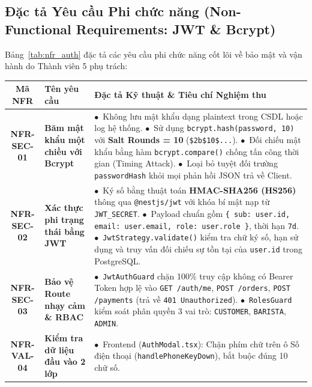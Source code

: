 \documentclass[a4paper]{article}
\begin{document}
\subsection{Đặc tả Yêu cầu Phi chức năng (Non-Functional Requirements: JWT \& Bcrypt)}
Bảng~\ref{tab:nfr_auth} đặc tả các yêu cầu phi chức năng cốt lõi về bảo mật và vận hành do Thành viên 5 phụ trách:

\begin{table}[H]
\centering
\small
\begin{tabularx}{\textwidth}{|c|p{3.2cm}|X|}
\hline
\textbf{Mã NFR} & \textbf{Tên yêu cầu} & \textbf{Đặc tả Kỹ thuật \& Tiêu chí Nghiệm thu} \\ \hline
\textbf{NFR-SEC-01} & \textbf{Băm mật khẩu một chiều với Bcrypt} & 
$\bullet$~Không lưu mật khẩu dạng plaintext trong CSDL hoặc log hệ thống. \newline
$\bullet$~Sử dụng \texttt{bcrypt.hash(password, 10)} với \textbf{Salt Rounds = 10} (\texttt{\$2b\$10\$...}). \newline
$\bullet$~Đối chiếu mật khẩu bằng hàm \texttt{bcrypt.compare()} chống tấn công thời gian (Timing Attack). \newline
$\bullet$~Loại bỏ tuyệt đối trường \texttt{passwordHash} khỏi mọi phản hồi JSON trả về Client. \\ \hline
\textbf{NFR-SEC-02} & \textbf{Xác thực phi trạng thái bằng JWT} & 
$\bullet$~Ký số bằng thuật toán \textbf{HMAC-SHA256 (HS256)} thông qua \texttt{@nestjs/jwt} với khóa bí mật nạp từ \texttt{JWT\_SECRET}. \newline
$\bullet$~Payload chuẩn gồm \texttt{\{ sub: user.id, email: user.email, role: user.role \}}, thời hạn \texttt{7d}. \newline
$\bullet$~\texttt{JwtStrategy.validate()} kiểm tra chữ ký số, hạn sử dụng và truy vấn đối chiếu sự tồn tại của \texttt{user.id} trong PostgreSQL. \\ \hline
\textbf{NFR-SEC-03} & \textbf{Bảo vệ Route nhạy cảm \& RBAC} & 
$\bullet$~\texttt{JwtAuthGuard} chặn 100\% truy cập không có Bearer Token hợp lệ vào \texttt{GET /auth/me}, \texttt{POST /orders}, \texttt{POST /payments} (trả về \texttt{401 Unauthorized}). \newline
$\bullet$~\texttt{RolesGuard} kiểm soát phân quyền 3 vai trò: \texttt{CUSTOMER}, \texttt{BARISTA}, \texttt{ADMIN}. \\ \hline
\textbf{NFR-VAL-04} & \textbf{Kiểm tra dữ liệu đầu vào 2 lớp} & 
$\bullet$~Frontend (\texttt{AuthModal.tsx}): Chặn phím chữ trên ô Số điện thoại (\texttt{handlePhoneKeyDown}), bắt buộc đúng 10 chữ số. \newline

\end{tabularx}
\end{table}
\end{document}
